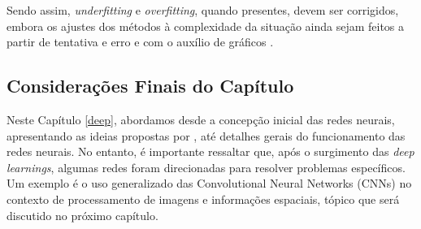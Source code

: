 Sendo assim, \textit{underfitting} e \textit{overfitting}, quando presentes, devem ser corrigidos, embora os ajustes dos métodos à complexidade da situação ainda sejam feitos a partir de tentativa e erro e com o auxílio de gráficos \citep{Goodfellow2016}.

\subsection{Considerações Finais do Capítulo}
\label{deep:conclusion}

Neste Capítulo \ref{deep}, abordamos desde a concepção inicial das redes neurais, apresentando as ideias propostas por \cite{mcculloch1943logical}, até detalhes gerais do funcionamento das redes neurais. No entanto, é importante ressaltar que, após o surgimento das \textit{deep learnings}, algumas redes foram direcionadas para resolver problemas específicos. Um exemplo é o uso generalizado das Convolutional Neural Networks (CNNs) no contexto de processamento de imagens e informações espaciais, tópico que será discutido no próximo capítulo.